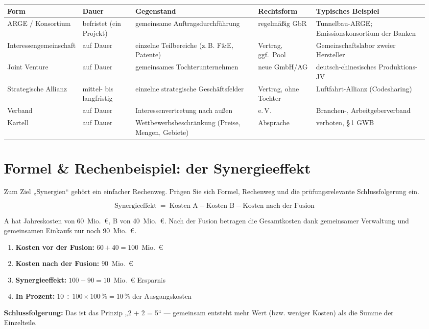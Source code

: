 \documentclass[11pt, a4paper]{article}
\begin{document}
\begin{center}
\small
\begin{tabular}{p{3.0cm} p{2.0cm} p{3.3cm} p{2.2cm} p{3.4cm}}
\toprule
\rowcolor{bfwTabHead}\textbf{Form} & \textbf{Dauer} & \textbf{Gegenstand} & \textbf{Rechtsform} & \textbf{Typisches Beispiel}\\
\midrule
ARGE / Konsortium & befristet (ein Projekt) & gemeinsame Auftragsdurchführung & regelmäßig GbR & Tunnelbau-ARGE; Emissionskonsortium der Banken\\
\addlinespace
\hspace{0pt}Interessengemeinschaft & auf Dauer & einzelne Teilbereiche (z.\,B. F\&E, Patente) & Vertrag, ggf.\ Pool & Gemeinschaftslabor zweier Hersteller\\
\addlinespace
Joint Venture & auf Dauer & gemeinsames Tochterunternehmen & neue GmbH/AG & deutsch-chinesisches Produktions-JV\\
\addlinespace
Strategische Allianz & mittel- bis langfristig & einzelne strategische Geschäftsfelder & Vertrag, ohne Tochter & Luftfahrt-Allianz (Codesharing)\\
\addlinespace
Verband & auf Dauer & Interessenvertretung nach außen & e.\,V. & Branchen-, Arbeitgeberverband\\
\addlinespace
Kartell & auf Dauer & \hspace{0pt}Wettbewerbsbeschränkung (Preise, Mengen, Gebiete) & Absprache & \textcolor{bfwWarn!85!black}{verboten, \S\,1 GWB}\\
\bottomrule
\end{tabular}
\end{center}

\section{Formel \& Rechenbeispiel: der Synergieeffekt}

Zum Ziel „Synergien`` gehört ein einfacher Rechenweg. Prägen Sie sich Formel,
Rechenweg und die prüfungsrelevante Schlussfolgerung ein.

\[
\textrm{Synergieeffekt} \;=\; \textrm{Kosten A} + \textrm{Kosten B} - \textrm{Kosten nach der Fusion}
\]

\begin{beispiel}[title={Rechenbeispiel: Kostensynergie}]
A hat Jahreskosten von 60~Mio.~€, B von 40~Mio.~€. Nach der Fusion betragen die
Gesamtkosten dank gemeinsamer Verwaltung und gemeinsamen Einkaufs nur noch 90~Mio.~€.
\begin{enumerate}
  \item \textbf{Kosten vor der Fusion:} $60 + 40 = 100$~Mio.~€
  \item \textbf{Kosten nach der Fusion:} $90$~Mio.~€
  \item \textbf{Synergieeffekt:} $100 - 90 = 10$~Mio.~€ Ersparnis
  \item \textbf{In Prozent:} $10 \div 100 \times 100\,\% = 10\,\%$ der Ausgangskosten
\end{enumerate}
\textbf{Schlussfolgerung:} Das ist das Prinzip „2 + 2 = 5`` --- gemeinsam entsteht mehr
Wert (bzw. weniger Kosten) als die Summe der Einzelteile.
\end{beispiel}
\end{document}
